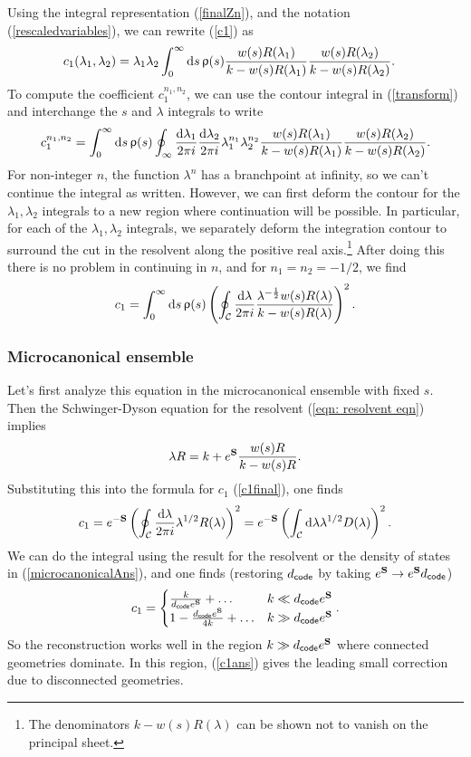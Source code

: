 \documentclass[11pt]{article}
\newcommand{\be}{\begin{equation}}
\newcommand{\ee}{\end{equation}}
\numberwithin{equation}{section}
\begin{document}
Using the integral representation (\ref{finalZn}), and the notation (\ref{rescaledvariables}), we can rewrite (\ref{c1}) as
\be
\begin{split}\label{c1first}
	c_1(\lambda_1,\lambda_2)&=\lambda_1\lambda_2\int_0^\infty \mathrm{d}s\,\uprho(s){w(s)R(\lambda_1) \over k- w(s)R(\lambda_1)}{w(s)R(\lambda_2)\over k-w(s)R(\lambda_2) }.
\end{split}
\ee
To compute the coefficient $c_1^{n_1,n_2}$, we can use the contour integral in (\ref{transform}) and interchange the $s$ and $\lambda$ integrals to write
\be
c_1^{n_1,n_2} = \int_0^\infty \mathrm{d}s\,\uprho(s)\oint_{\infty}\frac{\mathrm{d}\lambda_1}{2\pi i}\frac{\mathrm{d}\lambda_2}{2\pi i}\lambda_1^{n_1}\lambda_2^{n_2}{w(s)R(\lambda_1) \over k- w(s)R(\lambda_1)}{w(s)R(\lambda_2)\over k-w(s)R(\lambda_2) }.
\ee
For non-integer $n$, the function $\lambda^n$ has a branchpoint at infinity, so we can't continue the integral as written. However, we can first deform the contour for the $\lambda_1,\lambda_2$ integrals to a new region where continuation will be possible. In particular, for each of the $\lambda_1,\lambda_2$ integrals, we separately deform the integration contour to surround the cut in the resolvent along the positive real axis.\footnote{The denominators $k - w(s)R(\lambda)$ can be shown not to vanish on the principal sheet.} After doing this there is no problem in continuing in $n$, and for $n_1 = n_2 = -1/2$, we find
\be
c_1 = \int_0^\infty \mathrm{d}s\,\uprho(s)\left(\oint_{\mathcal{C}}\frac{\mathrm{d}\lambda}{2\pi i}{\lambda^{-\frac{1}{2}}w(s)R(\lambda) \over k- w(s)R(\lambda)}\right)^2.\label{c1final}
\ee


\subsubsection{Microcanonical ensemble}
Let's first analyze this equation in the microcanonical ensemble with fixed $s$. Then the Schwinger-Dyson equation for the resolvent (\ref{eqn: resolvent eqn}) implies
\be
\lambda R = k + e^{\bf{S}}\frac{w(s)R}{k - w(s)R}.
\ee
Substituting this into the formula for $c_1$ (\ref{c1final}), one finds
\be
c_1 = e^{-{\bf S}}\left(\oint_{\mathcal{C}}\frac{\mathrm{d}\lambda}{2\pi i}\lambda^{1/2}R(\lambda)\right)^2 = e^{-{\bf S}}\left(\int_{\mathcal{C}}\mathrm{d}\lambda\lambda^{1/2}D(\lambda)\right)^2.\label{c11}
\ee
We can do the integral using the result for the resolvent or the density of states in (\ref{microcanonicalAns}), and one finds (restoring $d_{\sf{code}}$ by taking $e^{\bf{S}}\to e^{\bf{S}}d_{\sf{code}}$)
\be
c_1 = \begin{cases}\frac{k}{d_{\sf{code}}e^{{\bf S}}} + \dots  & k \ll d_{\sf{code}}e^{\bf{S}} \\ 1 - \frac{d_{\sf{code}}e^{\bf S}}{4k} +\dots & k \gg d_{\sf{code}}e^{\bf{S}}\end{cases}.\label{c1ans}
\ee
So the reconstruction works well in the region $k \gg d_{\sf{code}}e^{\bf{S}}$ where connected geometries dominate. In this region, (\ref{c1ans}) gives the leading small correction due to disconnected geometries.
\end{document}

